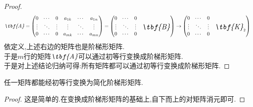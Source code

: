 \documentclass{ctexart}
\begin{document}
\begin{proof}
    \[\textit{\tbf{A}}=\begin{pmatrix}
        0&\cdots&0&a_{1k}&\cdots&a_{1n}\\
        \vdots&\ddots&\vdots&\vdots&\ddots&\vdots\\
        0&\cdots&0&a_{mk}&\cdots&a_{mn}
    \end{pmatrix}=\begin{pmatrix}
        0&\cdots&0&\\
        \vdots&\ddots&\vdots&\Large{\textit{\tbf{B}}}\\
        0&\cdots&0
    \end{pmatrix}\rightarrow\begin{pmatrix}
        0&\cdots&0&\\
        \vdots&\ddots&\vdots&\Large{\textit{\tbf{K}}_2}\\
        0&\cdots&0
    \end{pmatrix}\]
    依定义,上述右边的矩阵也是阶梯形矩阵.\\
    于是$m$行的矩阵$\textit{\tbf{A}}$可以通过初等行变换成阶梯形矩阵.\\
    于是对上述结论归纳可得:所有矩阵都可以通过初等行变换成阶梯形矩阵.
\end{proof}
\begin{theorem}[简化阶梯形矩阵的必然存在性]
    任一矩阵都能经初等行变换为简化阶梯形矩阵.
\end{theorem}
\begin{proof}
    这是简单的.在变换成阶梯形矩阵的基础上,自下而上的对矩阵消元即可.
\end{proof}
\end{document}
